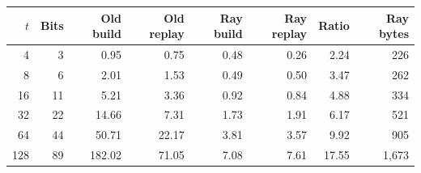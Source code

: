 \begin{tabular}{@{}rrrrrrrr@{}}
\toprule
$t$ & Bits & Old build & Old replay & Ray build & Ray replay & Ratio & Ray bytes \\
\midrule
4 & 3 & 0.95 & 0.75 & 0.48 & 0.26 & 2.24 & 226 \\
8 & 6 & 2.01 & 1.53 & 0.49 & 0.50 & 3.47 & 262 \\
16 & 11 & 5.21 & 3.36 & 0.92 & 0.84 & 4.88 & 334 \\
32 & 22 & 14.66 & 7.31 & 1.73 & 1.91 & 6.17 & 521 \\
64 & 44 & 50.71 & 22.17 & 3.81 & 3.57 & 9.92 & 905 \\
128 & 89 & 182.02 & 71.05 & 7.08 & 7.61 & 17.55 & 1,673 \\
\bottomrule
\end{tabular}
